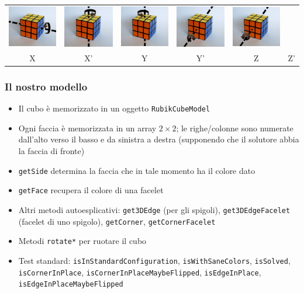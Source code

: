 \documentclass{beamer}
\begin{document}
\begin{frame}
\begin{table}[h]
\begin{tabular}{cccccc}
\includegraphics[width=.12\textwidth]{../graphics/moves/X_inv.png} &
\includegraphics[width=.12\textwidth]{../graphics/moves/Y.png} &
\includegraphics[width=.12\textwidth]{../graphics/moves/Y_inv.png} &
\includegraphics[width=.12\textwidth]{../graphics/moves/Z.png} &
\includegraphics[width=.12\textwidth]{../graphics/moves/Z_inv.png} \\
X & X' & Y & Y' & Z & Z'
\end{tabular}
\end{table}
\end{frame}

\begin{frame}
\frametitle{Il nostro modello}
\begin{itemize}
\item Il cubo è memorizzato in un oggetto \texttt{RubikCubeModel}
\item Ogni faccia è memorizzata in un array $2\times 2$; le righe/colonne sono
numerate dall'alto verso il basso e da sinistra a destra (supponendo che il
solutore abbia la faccia di fronte)
\item \texttt{getSide} determina la faccia che in tale momento ha il colore dato
\item \texttt{getFace} recupera il colore di una facelet
\item Altri metodi autoesplicativi: \texttt{get3DEdge} (per gli spigoli),
\texttt{get3DEdgeFacelet} (facelet di uno spigolo), \texttt{getCorner},
\texttt{getCornerFacelet}
\item Metodi \texttt{rotate*} per ruotare il cubo
\item Test standard: \texttt{isInStandardConfiguration},
\texttt{isWithSaneColors}, \texttt{isSolved}, \texttt{isCornerInPlace},
\texttt{isCornerInPlaceMaybeFlipped}, \texttt{isEdgeInPlace},
\texttt{isEdgeInPlaceMaybeFlipped}
\end{itemize}
\end{frame}
\end{document}

